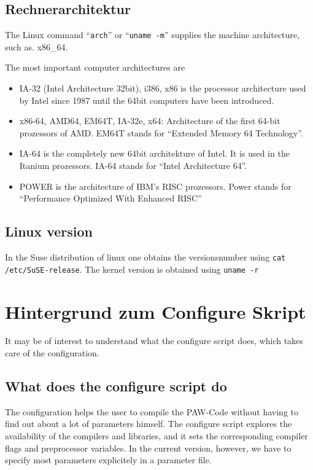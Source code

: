 \documentclass[a4paper,10pt]{report}
\newcommand{\mytt}[1]{{\tt #1}}
\begin{document}
\subsection{Rechnerarchitektur}
The Linux command ``\mytt{arch}'' or ``\mytt{uname -m}'' supplies the
machine architecture, such as. x86\_64.

The most important computer architectures are
\begin{itemize}
\item IA-32 (Intel Architecture 32bit), i386, x86 is the processor
architecture used by Intel since 1987 until the 64bit computers have
been introduced.
\item x86-64, AMD64, EM64T, IA-32e, x64:  Architecture of the first 64-bit
prozessors of  AMD. EM64T stands for ``Extended Memory 64 Technology''.
\item IA-64 is the completely new 64bit architekture of Intel. It is
used in the Itanium prozessors. IA-64 stands for ``Intel Architecture
64''.
\item POWER is the architecture of IBM's RISC prozessors.
Power stands for ``Performance Optimized With Enhanced RISC''
\end{itemize}

\subsection{Linux version}

In the Suse distribution of linux one obtains the versionsnumber using
\verb+cat /etc/SuSE-release+.  The kernel version is obtained using
\verb+uname -r+

\section{Hintergrund zum Configure Skript}
\label{sec:configurebackground}
It may be of interest to understand what the configure script does,
which takes care of the configuration.

\subsection{What does the configure script do}
The configuration helps the user to compile the PAW-Code without
having to find out about a lot of parameters himself.  The configure
script explores the availability of the compilers and libraries, and
it sets the corresponding compiler flags and preprocessor
variables. In the current version, however, we have to specify most
parameters explicitely in a parameter file.
\end{document}
